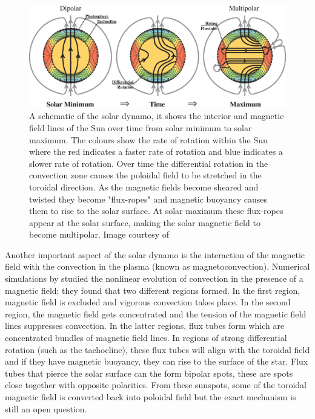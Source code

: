 \begin{figure}
    \centering
    \captionsetup{width=.9\linewidth}
    \includegraphics[width=.9\linewidth]{Figures/1-Introduction/dynamo_schem.eps}
    \caption[Schematic of the solar dynamo]{A schematic of the solar dynamo, it shows the interior and magnetic field lines of the Sun over time from solar minimum to solar maximum. The colours show the rate of rotation within the Sun where the red indicates a faster rate of rotation and blue indicates a slower rate of rotation. Over time the differential rotation in the convection zone causes the poloidal field to be stretched in the toroidal direction. As the magnetic fields become sheared and twisted they become "flux-ropes" and magnetic buoyancy causes them to rise to the solar surface. At solar maximum these flux-ropes appear at the solar surface, making the solar magnetic field to become multipolar. Image courtesy of \citet{higgins_2012}}
    \label{fig:dynamo}
\end{figure}

Another important aspect of the solar dynamo is the interaction of the magnetic field with the convection in the plasma (known as magnetoconvection). Numerical simulations by \citet{Weiss_1981} studied the nonlinear evolution of convection in the presence of a magnetic field; they found that two different regions formed. In the first region, magnetic field is excluded and vigorous convection takes place. In the second region, the magnetic field gets concentrated and the tension of the magnetic field lines suppresses convection. In the latter regions, flux tubes form which are concentrated bundles of magnetic field lines. In regions of strong differential rotation (such as the tachocline), these flux tubes will align with the toroidal field and if they have magnetic buoyancy, they can rise to the surface of the star. Flux tubes that pierce the solar surface can the form bipolar spots, these are spots close together with opposite polarities. From these sunspots, some of the toroidal magnetic field is converted back into poloidal field but the exact mechanism is still an open question.

